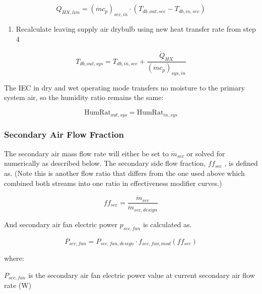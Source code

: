 \begin{equation}
\dot{Q}_{HX,lim} = \left(\dot{m}c_{p}\right)_{sec,in}\cdot \left( T_{db,out,sec}-T_{db,in,sec} \right)
\end{equation}

\begin{enumerate}
\def\labelenumi{\arabic{enumi}.}
\setcounter{enumi}{4}
\tightlist
\item
  Recalculate leaving supply air drybulb using new heat transfer rate from step 4
\end{enumerate}

\begin{equation}
T_{db,out,sys} = T_{db,in,sec} + \frac{\dot{Q}_{HX}}{ \left(\dot{m}c_{p}\right)_{sys,in}}
\end{equation}

The IEC in dry and wet operating mode transfers no moisture to the primary system air, so the humidity ratio remains the same:

\begin{equation}
\text{HumRat}_{out,sys} = \text{HumRat}_{in,sys}
\end{equation}

\subsubsection{Secondary Air Flow Fraction}\label{secondary-air-flow-fraction}

The secondary air mass flow rate will either be set to \(\dot{m}_{sec}\) or solved for numerically as described below. The secondary side flow fraction, \(ff_{sec}\) , is defined as. (Note this is another flow ratio that differs from the one used above which combined both streams into one ratio in effectiveness modifier curves.)

\begin{equation}
ff_{sec} = \frac{\dot{m}_{sec}}{\dot{m}_{sec,design}}
\end{equation}

And secondary air fan electric power \(p_{sec,fan}\) is calculated as.

\begin{equation}
P_{sec,fan} = P_{sec,fan,design}\cdot f_{sec,fan,mod}\left(ff_{sec}\right)
\end{equation}

where:

\(P_{sec,fan}\) is the secondary air fan electric power value at current secondary air flow rate (W)

